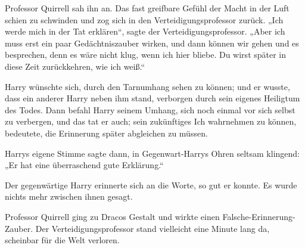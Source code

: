 Professor Quirrell sah ihn an. Das fast greifbare Gefühl der Macht in der Luft schien zu schwinden und zog sich in den Verteidigungsprofessor zurück.
„Ich werde mich in der Tat erklären“, sagte der Verteidigungsprofessor.
„Aber ich muss erst ein paar Gedächtniszauber wirken, und dann können wir gehen und es besprechen, denn es wäre nicht klug, wenn ich hier bliebe. Du wirst später in diese Zeit zurückkehren, wie ich weiß.“

Harry wünschte sich, durch den Tarnumhang sehen zu können; und er wusste, dass ein anderer Harry neben ihm stand, verborgen durch sein eigenes Heiligtum des Todes. Dann befahl Harry seinem Umhang, sich noch einmal vor sich selbst zu verbergen, und das tat er auch; sein zukünftiges Ich wahrnehmen zu können, bedeutete, die Erinnerung später abgleichen zu müssen.

Harrys eigene Stimme sagte dann, in Gegenwart-Harrys Ohren seltsam klingend:
„Er hat eine überraschend gute Erklärung.“

Der gegenwärtige Harry erinnerte sich an die Worte, so gut er konnte. Es wurde nichts mehr zwischen ihnen gesagt.

Professor Quirrell ging zu Dracos Gestalt und wirkte einen Falsche-Erinnerung-Zauber. Der Verteidigungsprofessor stand vielleicht eine Minute lang da, scheinbar für die Welt verloren.

